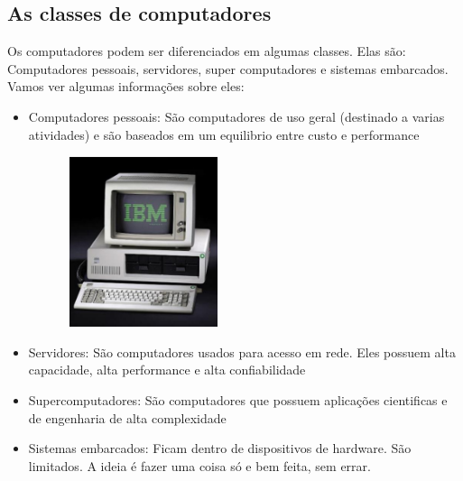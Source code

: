\documentclass[12pt,a4paper]{report}
\begin{document}
	\subsection{As classes de computadores}
	
	Os computadores podem ser diferenciados em algumas classes. Elas são: Computadores pessoais, servidores, super computadores e sistemas embarcados. Vamos ver algumas informações sobre eles: 
	
	\begin{itemize}
		\item Computadores pessoais: São computadores de uso geral (destinado a varias atividades) e são baseados em um equilibrio entre custo e performance
	\end{itemize}
	
	\begin{center}
		
		\includegraphics[width=8cm,height=5cm,keepaspectratio=false]{imagens-teoria/comp_geral.png}
		
	\end{center}
	
	\begin{itemize}
		\item Servidores: São computadores usados para acesso em rede. Eles possuem alta capacidade, alta performance e alta confiabilidade
	\end{itemize}
	
	\begin{itemize}
		\item Supercomputadores: São computadores que possuem aplicações cientificas e de engenharia de alta complexidade
	\end{itemize}
	
	\begin{itemize}
		\item Sistemas embarcados: Ficam dentro de dispositivos de hardware. São limitados. A ideia é fazer uma coisa só e bem feita, sem errar.
	\end{itemize}
	
\end{document}
